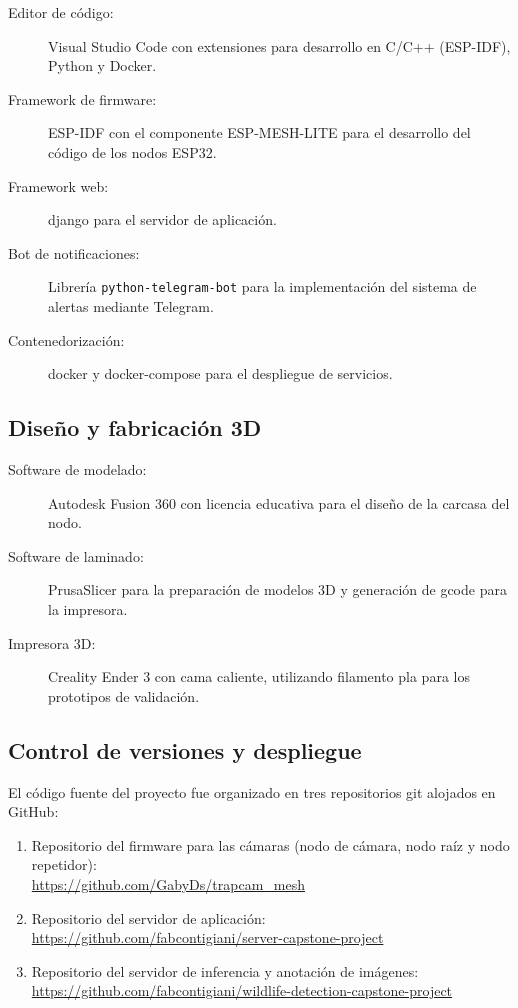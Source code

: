\documentclass[a4paper, 12pt]{report}
\begin{document}
\begin{description}
  \item[Editor de código:] Visual Studio Code con extensiones para desarrollo
    en C/C++ (ESP-IDF), Python y Docker.
  \item[Framework de firmware:] \gls{ESP-IDF} con el componente
    \gls{ESP-MESH-LITE} para el desarrollo del código de los nodos
    \gls{ESP32}.
  \item[Framework web:] \gls{django} para el servidor de aplicación.
  \item[Bot de notificaciones:] Librería \texttt{python-telegram-bot} para
    la implementación del sistema de alertas mediante Telegram.
  \item[Contenedorización:] \gls{docker} y \gls{docker-compose} para el
    despliegue de servicios.
\end{description}

\subsection{Diseño y fabricación 3D}

\begin{description}
  \item[Software de modelado:] Autodesk Fusion 360 con licencia educativa para
    el diseño de la \gls{carcasa} del nodo.
  \item[Software de laminado:] PrusaSlicer para la preparación de modelos 3D
    y generación de \gls{gcode} para la impresora.
  \item[Impresora 3D:] Creality Ender 3 con cama caliente, utilizando filamento
    \gls{pla} para los prototipos de validación.
\end{description}

\subsection{Control de versiones y despliegue}

El código fuente del proyecto fue organizado en tres repositorios \gls{git} alojados
en GitHub:
\begin{enumerate}
  \item Repositorio del \gls{firmware} para las cámaras (nodo de cámara, nodo
    raíz y nodo repetidor):\\
    \url{https://github.com/GabyDs/trapcam_mesh}
  \item Repositorio del servidor de aplicación:\\
    \url{https://github.com/fabcontigiani/server-capstone-project}
  \item Repositorio del servidor de inferencia y anotación de imágenes:\\
    \url{https://github.com/fabcontigiani/wildlife-detection-capstone-project}
\end{enumerate}
\end{document}
